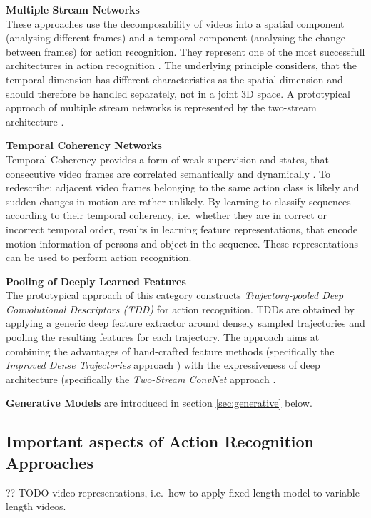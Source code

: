 \textbf{Multiple Stream Networks}\\
These approaches use the decomposability of videos into a spatial component (analysing different frames) and a temporal component (analysing the change between frames) for action recognition.
They represent one of the most successfull architectures in action recognition \cite{wang_action_2015}.
The underlying principle considers, that the temporal dimension has different characteristics as the spatial dimension and should therefore be handled separately, not in a joint 3D space.
A prototypical approach of multiple stream networks is represented by the two-stream architecture \cite{simonyan_two-stream_2014}.

\textbf{Temporal Coherency Networks}\\
Temporal Coherency provides a form of weak supervision and states, that consecutive video frames are correlated semantically and dynamically \cite{herath_going_2016}.
To redescribe: adjacent video frames belonging to the same action class is likely and sudden changes in motion are rather unlikely.
By learning to classify sequences according to their temporal coherency, i.e.\ whether they are in correct or incorrect temporal order, results in learning feature representations, that encode motion information of persons and object in the sequence.
These representations can be used to perform action recognition.

\textbf{Pooling of Deeply Learned Features}\\
The prototypical approach of this category constructs \textit{Trajectory-pooled Deep Convolutional Descriptors (TDD)} \cite{wang_action_2015} for action recognition.
TDDs are obtained by applying a generic deep feature extractor around densely sampled trajectories and pooling the resulting features for each trajectory.
The approach aims at combining the advantages of hand-crafted feature methods (specifically the \textit{Improved Dense Trajectories} approach \cite{wang_action_2013}) with the expressiveness of deep architecture (specifically the \textit{Two-Stream ConvNet} approach \cite{simonyan_two-stream_2014}.

\textbf{Generative Models} are introduced in section \ref{sec:generative} below.

\subsection{Important aspects of Action Recognition Approaches}
?? TODO video representations, i.e.\ how to apply fixed length model to variable length videos.

